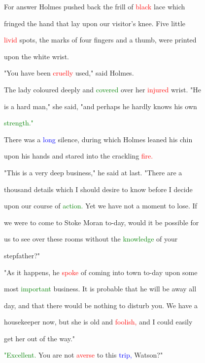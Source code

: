 For answer Holmes pushed back the frill of \textcolor{red}{black} \textcolor{BurntOrange}{lace} which

 fringed the hand that lay upon our \textcolor{BurntOrange}{visitor's} knee. Five little

 \textcolor{red}{livid} spots, the marks of four fingers and a thumb, were printed

 upon the \textcolor{BurntOrange}{white} wrist.



 "You have been \textcolor{red}{cruelly} used," said Holmes.



 The lady coloured deeply and \textcolor{green}{covered} over her \textcolor{red}{injured} wrist. "He

 is a hard man," she said, "and perhaps he hardly knows his own

 \textcolor{green}{strength."}



 There was a \textcolor{blue}{long} silence, during which Holmes leaned his chin

 upon his hands and \textcolor{BurntOrange}{stared} into the crackling \textcolor{red}{fire.}



 "This is a very deep business," he said at last. "There are a

 thousand details which I should desire to know before I decide

 upon our course of \textcolor{green}{action.} Yet we have not a moment to \textcolor{BurntOrange}{lose.} If

 we were to come to Stoke Moran to-day, would it be possible for

 us to see over these rooms without the \textcolor{green}{knowledge} of your

 stepfather?"



 "As it happens, he \textcolor{red}{spoke} of coming into town to-day upon some

 most \textcolor{green}{important} business. It is probable that he will be away all

 day, and that there would be nothing to disturb you. We have a

 housekeeper now, but she is old and \textcolor{red}{foolish,} and I could easily

 get her out of the way."



 \textcolor{green}{"Excellent.} You are not \textcolor{red}{averse} to this \textcolor{blue}{trip,} Watson?"



